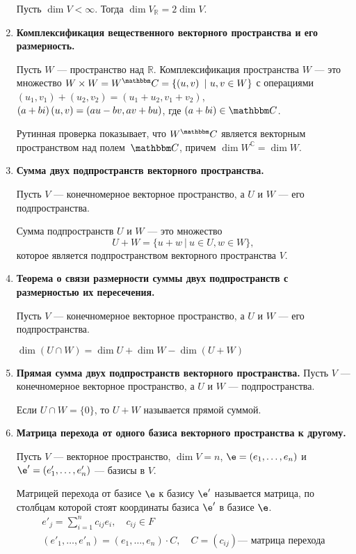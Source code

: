 \begin{enumerate}
Пусть $\dim V < \infty$. Тогда $\dim V_\mathbb{R} = 2\dim V$.

\item \textbf{Комплексификация вещественного векторного пространства и его размерность.}

Пусть $W$ --- пространство над $\mathbb{R}$. Комплексификация пространства $W$ --- это множество $W\times W = W^\mathbb{C} \hm{=} \{\left( u, v\right)\ |\ u,v \in W\}$ с операциями $\left(u_1, v_1\right) + \left(u_2, v_2\right) = \left(u_1+u_2, v_1+v_2\right)$, $\left(a +  bi\right)\left(u, v\right) \hm{=} \left(au-bv, av+bu\right)$, где $(a + bi) \in \C$.

Рутинная проверка показывает, что $W^\C$ является векторным пространством над полем~$\C$, причем $\dim W^\mathbb{C} = \dim W$.

\item \textbf{Сумма двух подпространств векторного пространства.}

Пусть $V$ --- конечномерное векторное пространство, а $U$ и $W$ --- его подпространства.

Сумма подпространств $U$ и $W$ --- это множество
\[
U+W = \{u + w\ |\ u \in U, w \in W\},
\]
которое является подпространством векторного пространства $V$.

\item \textbf{Теорема о связи размерности суммы двух подпространств с размерностью их пересечения.}

Пусть $V$ --- конечномерное векторное пространство, а $U$ и $W$ --- его подпространства.

$\dim \left(U \cap W\right) = \dim U + \dim W - \dim \left(U+W\right)$

\item \textbf{Прямая сумма двух подпространств векторного пространства.}
Пусть $V$ --- конечномерное векторное пространство, а $U$ и $W$ --- подпространства.

Если $U \cap W = \{0\}$, то $U + W$ называется прямой суммой.

\item \textbf{Матрица перехода от одного базиса векторного пространства к другому.}

Пусть $V$ --- векторное пространство, $\dim V = n$, $\e = (e_1, \ldots, e_n)$ и $\e' =(e_1', \ldots, e_n')$ --- базисы в $V$.

Матрицей перехода от базисе $\e$ к базису $\e'$ называется матрица, по столбцам которой стоят координаты базиса $\e'$ в базисе $\e$.
\begin{gather*}
e'_j = \sum_{i = 1}^{n} c_{ij}e_i, \quad c_{ij} \in F \\
(e'_1, \ldots, e'_n) = (e_1, \ldots, e_n) \cdot C, \quad C = (c_{ij}) \text{--- матрица перехода}
\end{gather*}


\end{enumerate}
